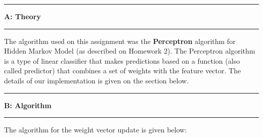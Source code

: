 \documentclass[11pt]{article}
\newcommand\question[2]{\vspace{.25in}\hrule\textbf{#1: #2}\vspace{.5em}\hrule\vspace{.10in}}
\begin{document}
\newcommand\NAME{Turash and Luiz}  %
\newcommand\ID{tmosharr \& lperesde}     %
\newcommand\HWNUM{}              %




\question{A}{Theory} 

The algorithm used on this assignment was the \textbf{Perceptron} algorithm for Hidden Markov Model (as described on Homework 2). The Perceptron algorithm is a type of linear classifier that makes predictions based on a function (also called predictor) that combines a set of weights with the feature vector. The details of our implementation is given on the section below.

\question{B}{Algorithm} 

The algorithm for the weight vector update is given below:		
\end{document}
